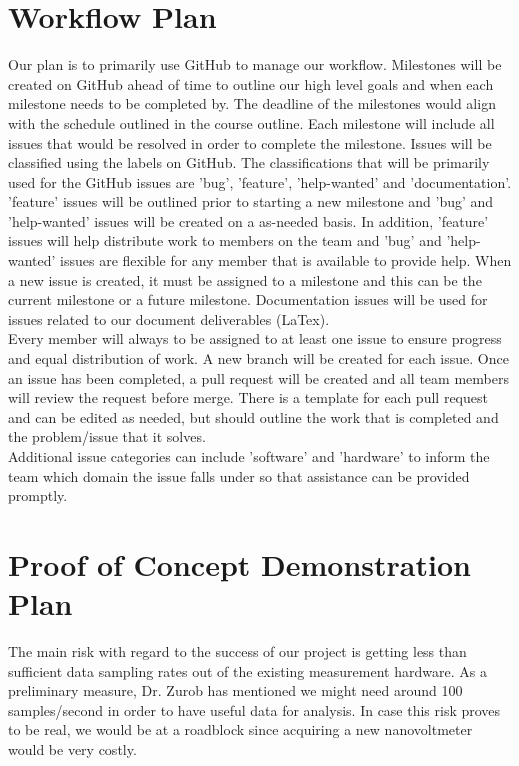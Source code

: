 \documentclass{article}
\begin{document}
\section{Workflow Plan}

\noindent Our plan is to primarily use GitHub to manage our workflow. 
Milestones will be created on GitHub ahead of time to outline our high level goals and when each milestone needs to be completed by.
The deadline of the milestones would align with the schedule outlined in the course outline.
Each milestone will include all issues that would be resolved in order to complete the milestone. 
Issues will be classified using the labels on GitHub. The classifications that will be primarily used for the 
GitHub issues are 'bug', 'feature', 'help-wanted' and 'documentation'. 'feature' issues will be outlined prior to starting a 
new milestone and 'bug' and 'help-wanted' issues will be created on a as-needed basis. In addition, 'feature' issues will help distribute work to 
members on the team and 'bug' and 'help-wanted' issues are flexible for any member that is available to provide help. 
When a new issue is created, it must be assigned to a milestone and this can be the current milestone or a future milestone.
Documentation issues will be used for issues related to our document deliverables (LaTex). \\

\noindent Every member will always to be assigned to at least one issue to ensure progress and equal distribution of work.
A new branch will be created for each issue. Once an issue has been completed, 
a pull request will be created and all team members will review the request before merge. 
There is a template for each pull request and can be edited as needed, but should outline the work that is completed
and the problem/issue that it solves. \\

\noindent Additional issue categories can include 'software' and 'hardware' to inform the team which domain the issue falls under so 
that assistance can be provided promptly.

\section{Proof of Concept Demonstration Plan}

The main risk with regard to the success of our project is getting less than sufficient data sampling rates out of the existing measurement hardware. As a preliminary measure, Dr. Zurob has mentioned we might need around 100 samples/second in order to have useful data for analysis. In case this risk proves to be real, we would be at a roadblock since acquiring a new nanovoltmeter would be very costly.
\end{document}
